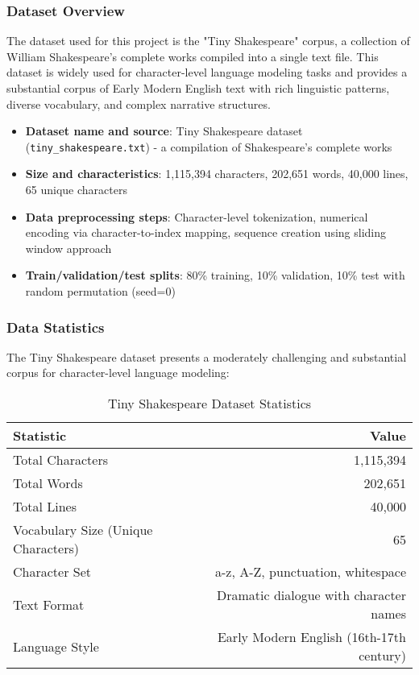 \documentclass[12pt]{article}
\begin{document}
\subsubsection{Dataset Overview}
The dataset used for this project is the "Tiny Shakespeare" corpus, a collection of William Shakespeare's complete works compiled into a single text file. This dataset is widely used for character-level language modeling tasks and provides a substantial corpus of Early Modern English text with rich linguistic patterns, diverse vocabulary, and complex narrative structures.

\begin{itemize}
    \item \textbf{Dataset name and source}: Tiny Shakespeare dataset (\texttt{tiny\_shakespeare.txt}) - a compilation of Shakespeare's complete works
    \item \textbf{Size and characteristics}: 1,115,394 characters, 202,651 words, 40,000 lines, 65 unique characters
    \item \textbf{Data preprocessing steps}: Character-level tokenization, numerical encoding via character-to-index mapping, sequence creation using sliding window approach
    \item \textbf{Train/validation/test splits}: 80\% training, 10\% validation, 10\% test with random permutation (seed=0)
\end{itemize}

\subsubsection{Data Statistics}
The Tiny Shakespeare dataset presents a moderately challenging and substantial corpus for character-level language modeling:

\begin{table}[h]
\centering
\begin{tabular}{|l|r|}
\hline
\textbf{Statistic} & \textbf{Value} \\
\hline
Total Characters & 1,115,394 \\
Total Words & 202,651 \\
Total Lines & 40,000 \\
Vocabulary Size (Unique Characters) & 65 \\
Character Set & a-z, A-Z, punctuation, whitespace \\
Text Format & Dramatic dialogue with character names \\
Language Style & Early Modern English (16th-17th century) \\
\hline
\end{tabular}
\caption{Tiny Shakespeare Dataset Statistics}
\label{tab:dataset_stats}
\end{table}
\end{document}
